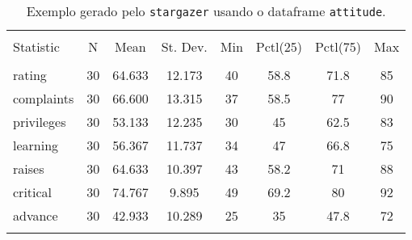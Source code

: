 \begin{table}[!htbp] \centering 
  \caption{Exemplo gerado pelo \texttt{stargazer} usando o dataframe \texttt{attitude}.} 
  \label{tab-ex-stargazer} 
\begin{tabular}{@{\extracolsep{5pt}}lccccccc} 
\\[-1.8ex]\hline 
\hline \\[-1.8ex] 
Statistic & \multicolumn{1}{c}{N} & \multicolumn{1}{c}{Mean} & \multicolumn{1}{c}{St. Dev.} & \multicolumn{1}{c}{Min} & \multicolumn{1}{c}{Pctl(25)} & \multicolumn{1}{c}{Pctl(75)} & \multicolumn{1}{c}{Max} \\ 
\hline \\[-1.8ex] 
rating & 30 & 64.633 & 12.173 & 40 & 58.8 & 71.8 & 85 \\ 
complaints & 30 & 66.600 & 13.315 & 37 & 58.5 & 77 & 90 \\ 
privileges & 30 & 53.133 & 12.235 & 30 & 45 & 62.5 & 83 \\ 
learning & 30 & 56.367 & 11.737 & 34 & 47 & 66.8 & 75 \\ 
raises & 30 & 64.633 & 10.397 & 43 & 58.2 & 71 & 88 \\ 
critical & 30 & 74.767 & 9.895 & 49 & 69.2 & 80 & 92 \\ 
advance & 30 & 42.933 & 10.289 & 25 & 35 & 47.8 & 72 \\ 
\hline \\[-1.8ex] 
\end{tabular} 
\end{table} 

